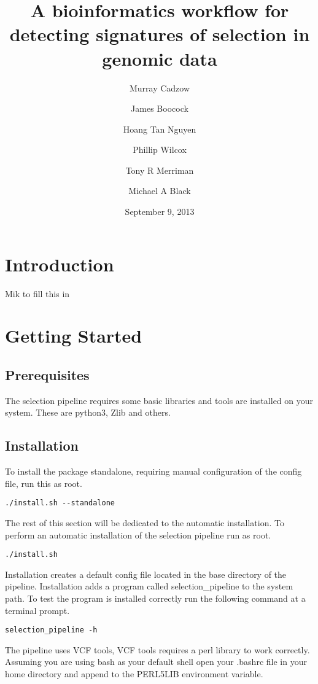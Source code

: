 \documentclass[a4paper,10pt]{article}
\title{\textbf{A bioinformatics workflow for detecting signatures of selection in genomic data}}
\date{September 9, 2013}
\author[1,2]{Murray Cadzow}
\author[1,2]{James Boocock}
\author[1,2]{Hoang Tan Nguyen}
\author[2,3]{Phillip Wilcox}
\author[1]{Tony R Merriman}
\author[1]{Michael A Black}
\affil[1]{Department of Biochemistry, University of Otago}
\affil[2]{Department of Mathematics and Statistics, University of Otago}
\affil[3]{Scion Research, Rotorua, New Zealand}
\begin{document}
\maketitle{}
\doublespacing
\tableofcontents





\section{Introduction}
Mik to fill this in
\section{Getting Started}
\subsection{Prerequisites}
The selection pipeline requires some basic libraries and tools are installed on your system. These are python3, Zlib and others.
\subsection{Installation}
To install the package standalone, requiring manual configuration of the config file, run this as root.\\

\begin{verbatim}
./install.sh --standalone
\end{verbatim}

The rest of this section will be dedicated to the automatic installation. To perform an automatic installation of the selection pipeline run as root.\\
\begin{verbatim}
./install.sh
\end{verbatim}

Installation creates a default config file located in the base directory of the pipeline. Installation adds a program called selection\_pipeline to the system path. To test the program is installed correctly run the following command at a terminal prompt.

\begin{verbatim}
selection_pipeline -h
\end{verbatim}

The pipeline uses VCF tools, VCF tools requires a perl library to work correctly. Assuming you are using bash as your default shell open your .bashrc file in your home directory and append to the PERL5LIB environment variable.
\end{document}
